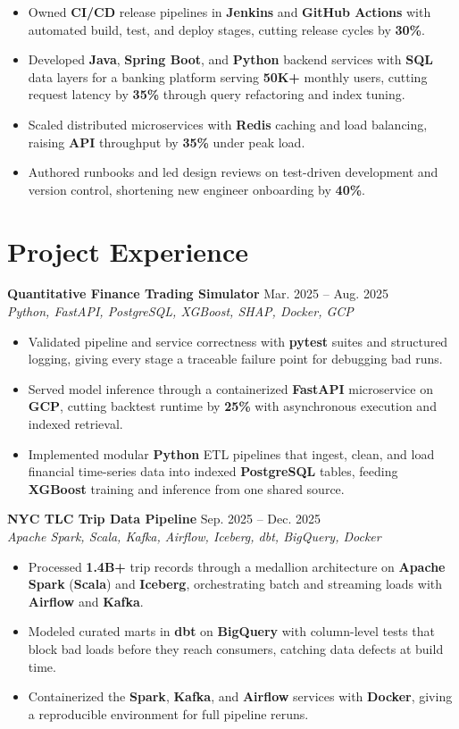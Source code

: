 \documentclass[letterpaper,10pt]{article}
\newcommand{\projectheading}[3]{\textbf{#1} \hfill {\small #3} \\[-1pt] \textit{\small #2}}
\begin{document}
\begin{itemize}
\item Owned \textbf{CI/CD} release pipelines in \textbf{Jenkins} and \textbf{GitHub Actions} with automated build, test, and deploy stages, cutting release cycles by \textbf{30\%}.
\item Developed \textbf{Java}, \textbf{Spring Boot}, and \textbf{Python} backend services with \textbf{SQL} data layers for a banking platform serving \textbf{50K+} monthly users, cutting request latency by \textbf{35\%} through query refactoring and index tuning.
\item Scaled distributed microservices with \textbf{Redis} caching and load balancing, raising \textbf{API} throughput by \textbf{35\%} under peak load.
\item Authored runbooks and led design reviews on test-driven development and version control, shortening new engineer onboarding by \textbf{40\%}.
\end{itemize}

\section{Project Experience}
\projectheading{Quantitative Finance Trading Simulator}{Python, FastAPI, PostgreSQL, XGBoost, SHAP, Docker, GCP}{Mar. 2025 -- Aug. 2025}
\begin{itemize}
\item Validated pipeline and service correctness with \textbf{pytest} suites and structured logging, giving every stage a traceable failure point for debugging bad runs.
\item Served model inference through a containerized \textbf{FastAPI} microservice on \textbf{GCP}, cutting backtest runtime by \textbf{25\%} with asynchronous execution and indexed retrieval.
\item Implemented modular \textbf{Python} ETL pipelines that ingest, clean, and load financial time-series data into indexed \textbf{PostgreSQL} tables, feeding \textbf{XGBoost} training and inference from one shared source.
\end{itemize}
\vspace{2pt}
\projectheading{NYC TLC Trip Data Pipeline}{Apache Spark, Scala, Kafka, Airflow, Iceberg, dbt, BigQuery, Docker}{Sep. 2025 -- Dec. 2025}
\begin{itemize}
\item Processed \textbf{1.4B+} trip records through a medallion architecture on \textbf{Apache Spark} (\textbf{Scala}) and \textbf{Iceberg}, orchestrating batch and streaming loads with \textbf{Airflow} and \textbf{Kafka}.
\item Modeled curated marts in \textbf{dbt} on \textbf{BigQuery} with column-level tests that block bad loads before they reach consumers, catching data defects at build time.
\item Containerized the \textbf{Spark}, \textbf{Kafka}, and \textbf{Airflow} services with \textbf{Docker}, giving a reproducible environment for full pipeline reruns.
\end{itemize}
\end{document}
